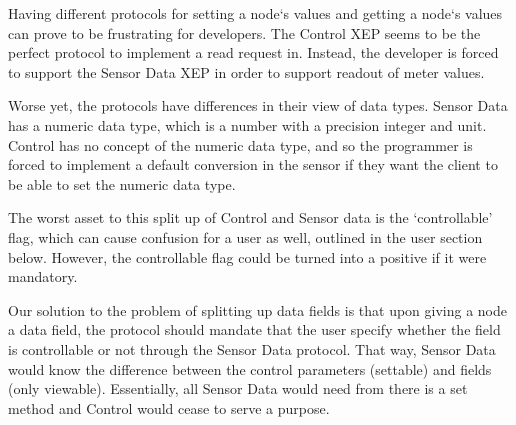 Having different protocols for setting a node`s values and getting a node`s
values can prove to be frustrating for developers. The Control XEP seems to be
the perfect protocol to implement a read request in. Instead, the developer is
forced to support the Sensor Data XEP in order to support readout of meter
values.

Worse yet, the protocols have differences in their view of data types. Sensor
Data has a numeric data type, which is a number with a precision integer and
unit. Control has no concept of the numeric data type, and so the programmer is
forced to implement a default conversion in the sensor if they want the client
to be able to set the numeric data type.

The worst asset to this split up of Control and Sensor data is the
`controllable' flag, which can cause confusion for a user as well, outlined in
the user section below. However, the controllable flag could be turned into a
positive if it were mandatory.

Our solution to the problem of splitting up data fields is that upon giving a
node a data field, the protocol should mandate that the user specify whether the
field is controllable or not through the Sensor Data protocol. That way, Sensor
Data would know the difference between the control parameters (settable) and
fields (only viewable). Essentially, all Sensor Data would need from there is a
set method and Control would cease to serve a purpose.
